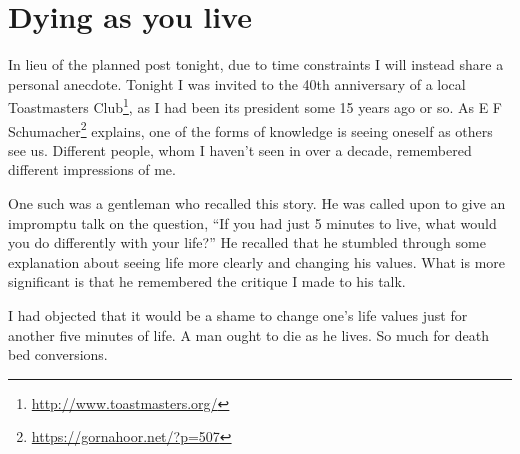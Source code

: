 \section{Dying as you live}

In lieu of the planned post tonight, due to time constraints I will instead share a personal anecdote. Tonight I was invited to the 40th anniversary of a local Toastmasters Club\footnote{\url{http://www.toastmasters.org/}}, as I had been its president some 15 years ago or so. As E F Schumacher\footnote{\url{https://gornahoor.net/?p=507}} explains, one of the forms of knowledge is seeing oneself as others see us. Different people, whom I haven't seen in over a decade, remembered different impressions of me.

One such was a gentleman who recalled this story. He was called upon to give an impromptu talk on the question, ``If you had just 5 minutes to live, what would you do differently with your life?'' He recalled that he stumbled through some explanation about seeing life more clearly and changing his values. What is more significant is that he remembered the critique I made to his talk.

I had objected that it would be a shame to change one's life values just for another five minutes of life. A man ought to die as he lives. So much for death bed conversions.



